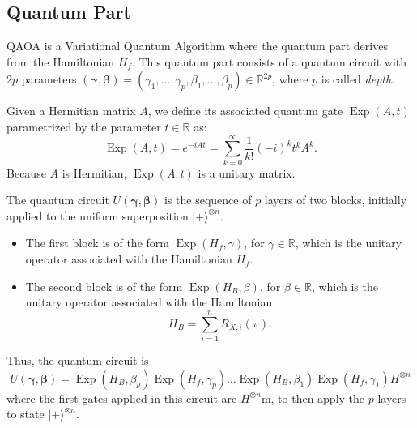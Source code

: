 \subsection{Quantum Part}

QAOA is a Variational Quantum Algorithm where the quantum part derives from the Hamiltonian $H_{f}$. This quantum part consists of a quantum circuit with $2 p$ parameters $(\boldsymbol{\gamma}, \boldsymbol{\beta})=\left(\gamma_{1}, \ldots, \gamma_{p}, \beta_{1}, \ldots, \beta_{p}\right) \in \mathbb{R}^{2 p}$, where $p$ is called \textit{depth}. 

\begin{definition}
    Given a Hermitian matrix $A$, we define its associated quantum gate $\operatorname{Exp}(A, t)$ parametrized by the parameter $t \in \mathbb{R}$ as:
\begin{equation}
    \operatorname{Exp}(A, t) =e^{-i A t} 
=\sum_{k=0}^{\infty} \frac{1}{k!}(-i)^{k} t^{k} A^{k}.
\end{equation}
Because $A$ is Hermitian, $\operatorname{Exp}(A, t)$ is a unitary matrix.
\end{definition}

The quantum circuit $U(\boldsymbol{\gamma}, \boldsymbol{\beta})$ is the sequence of $p$ layers of two blocks, initially applied to the uniform superposition $|+\rangle^{\otimes n}$. %
\begin{itemize}
    \item The first block is of the form $\operatorname{Exp}\left(H_{f}, \gamma\right)$, for $\gamma \in \mathbb{R}$, which is the unitary operator associated with the Hamiltonian $H_{f}$.
    \item The second block is of the form $\operatorname{Exp}\left(H_{B}, \beta\right)$, for $\beta \in \mathbb{R}$, which is the unitary operator associated with the Hamiltonian
    \begin{equation}
    H_{B}=\sum_{i=1}^{n} R_{X, i}(\pi).
\end{equation}
\end{itemize}
Thus, the quantum circuit is
\begin{equation}
    U(\boldsymbol{\gamma}, \boldsymbol{\beta})=\operatorname{Exp}\left(H_{B}, \beta_{p}\right) \operatorname{Exp}\left(H_{f}, \gamma_{p}\right) \ldots \operatorname{Exp}\left(H_{B}, \beta_{1}\right) \operatorname{Exp}\left(H_{f}, \gamma_{1}\right) H^{\otimes n} \tag{22}
\end{equation}
where the first gates applied in this circuit are $H^{\otimes n}$m, to then apply the $p$ layers to state $|+\rangle^{\otimes n}$. 

